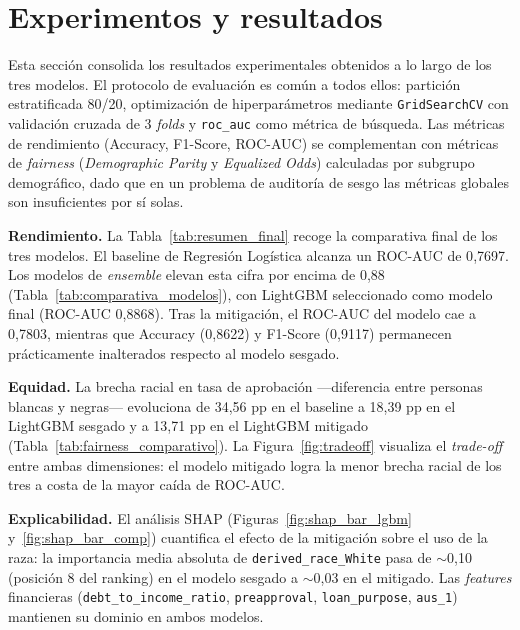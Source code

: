 \documentclass[11pt,a4paper]{article}
\begin{document}
\section{Experimentos y resultados}
\label{sec:resultados}

Esta sección consolida los resultados experimentales obtenidos a lo largo de los tres modelos.
El protocolo de evaluación es común a todos ellos: partición estratificada 80/20, optimización
de hiperparámetros mediante \texttt{GridSearchCV} con validación cruzada de 3 \textit{folds} y
\texttt{roc\_auc} como métrica de búsqueda. Las métricas de rendimiento (Accuracy, F1-Score,
ROC-AUC) se complementan con métricas de \textit{fairness} (\textit{Demographic Parity} y
\textit{Equalized Odds}) calculadas por subgrupo demográfico, dado que en un problema de auditoría
de sesgo las métricas globales son insuficientes por sí solas.

\textbf{Rendimiento.} La Tabla~\ref{tab:resumen_final} recoge la comparativa final de los tres
modelos. El baseline de Regresión Logística alcanza un ROC-AUC de 0{,}7697. Los modelos de
\textit{ensemble} elevan esta cifra por encima de 0{,}88 (Tabla~\ref{tab:comparativa_modelos}),
con LightGBM seleccionado como modelo final (ROC-AUC 0{,}8868). Tras la mitigación, el ROC-AUC
del modelo cae a 0{,}7803, mientras que Accuracy (0{,}8622) y F1-Score (0{,}9117) permanecen
prácticamente inalterados respecto al modelo sesgado.

\textbf{Equidad.} La brecha racial en tasa de aprobación ---diferencia entre personas blancas y
negras--- evoluciona de 34{,}56 pp en el baseline a 18{,}39 pp en el LightGBM sesgado y a
13{,}71 pp en el LightGBM mitigado (Tabla~\ref{tab:fairness_comparativo}). La
Figura~\ref{fig:tradeoff} visualiza el \textit{trade-off} entre ambas dimensiones: el modelo
mitigado logra la menor brecha racial de los tres a costa de la mayor caída de ROC-AUC.

\textbf{Explicabilidad.} El análisis SHAP (Figuras~\ref{fig:shap_bar_lgbm}
y~\ref{fig:shap_bar_comp}) cuantifica el efecto de la mitigación sobre el uso de la raza: la
importancia media absoluta de \texttt{derived\_race\_White} pasa de $\sim$0{,}10 (posición 8 del
ranking) en el modelo sesgado a $\sim$0{,}03 en el mitigado. Las \textit{features} financieras
(\texttt{debt\_to\_income\_ratio}, \texttt{preapproval}, \texttt{loan\_purpose}, \texttt{aus\_1})
mantienen su dominio en ambos modelos.
\end{document}
